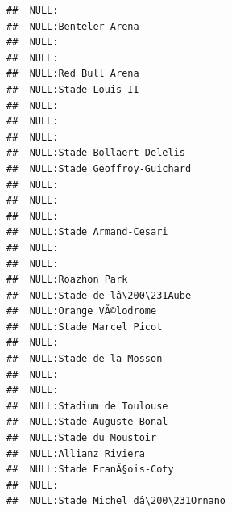 \documentclass{article}\usepackage[]{graphicx}\usepackage[]{color}
\makeatletter
\newenvironment{kframe}{%
 \def\at@end@of@kframe{}%
 \ifinner\ifhmode%
  \def\at@end@of@kframe{\end{minipage}}%
  \begin{minipage}{\columnwidth}%
 \fi\fi%
 \def\FrameCommand##1{\hskip\@totalleftmargin \hskip-\fboxsep
 \colorbox{shadecolor}{##1}\hskip-\fboxsep
     \hskip-\linewidth \hskip-\@totalleftmargin \hskip\columnwidth}%
 \MakeFramed {\advance\hsize-\width
   \@totalleftmargin\z@ \linewidth\hsize
   \@setminipage}}%
 {\par\unskip\endMakeFramed%
 \at@end@of@kframe}
\newenvironment{knitrout}{}{} %
\makeatother
\begin{document}
\begin{knitrout}
\begin{kframe}
\begin{verbatim}
##  NULL:                                                                       
##  NULL:Benteler-Arena                                                         
##  NULL:                                                                       
##  NULL:                                                                       
##  NULL:Red Bull Arena                                                         
##  NULL:Stade Louis II                                                         
##  NULL:                                                                       
##  NULL:                                                                       
##  NULL:                                                                       
##  NULL:Stade Bollaert-Delelis                                                 
##  NULL:Stade Geoffroy-Guichard                                                
##  NULL:                                                                       
##  NULL:                                                                       
##  NULL:                                                                       
##  NULL:Stade Armand-Cesari                                                    
##  NULL:                                                                       
##  NULL:                                                                       
##  NULL:Roazhon Park                                                           
##  NULL:Stade de lâ\200\231Aube                                                      
##  NULL:Orange VÃ©lodrome                                                      
##  NULL:Stade Marcel Picot                                                     
##  NULL:                                                                       
##  NULL:Stade de la Mosson                                                     
##  NULL:                                                                       
##  NULL:                                                                       
##  NULL:Stadium de Toulouse                                                    
##  NULL:Stade Auguste Bonal                                                    
##  NULL:Stade du Moustoir                                                      
##  NULL:Allianz Riviera                                                        
##  NULL:Stade FranÃ§ois-Coty                                                   
##  NULL:                                                                       
##  NULL:Stade Michel dâ\200\231Ornano                                                

\end{verbatim}
\end{kframe}
\end{knitrout}
\end{document}
